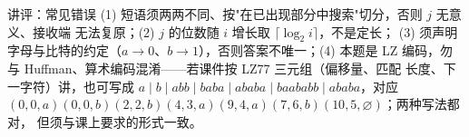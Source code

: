 \begin{warning}{讲评：常见错误}
(1) 短语须两两不同、按"在已出现部分中搜索"切分，否则 $j$ 无意义、接收端
无法复原；(2) $j$ 的位数随 $i$ 增长取 $\lceil\log_2i\rceil$，不是定长；
(3) 须声明字母与比特的约定（$a\to0$、$b\to1$），否则答案不唯一；(4) 本题是
LZ 编码，勿与 Huffman、算术编码混淆——若课件按 LZ77 三元组（偏移量、匹配
长度、下一字符）讲，也可写成 $a\mid b\mid abb\mid baba\mid ababa\mid
baababb\mid ababa$，对应
$(0,0,a)(0,0,b)(2,2,b)(4,3,a)(9,4,a)(7,6,b)(10,5,\varnothing)$；两种写法都对，
但须与课上要求的形式一致。
\end{warning}

